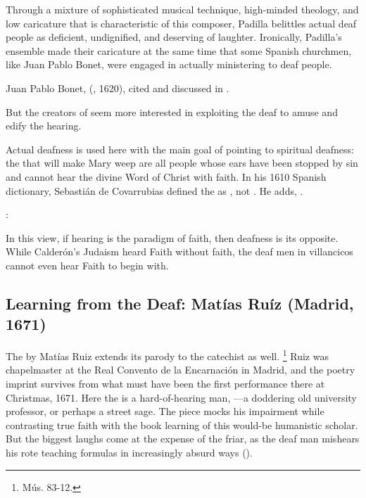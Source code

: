 Through a mixture of sophisticated musical technique, high-minded theology, and low caricature that is characteristic of this composer, Padilla belittles actual deaf people as deficient, undignified, and deserving of laughter.
Ironically, Padilla's ensemble made their caricature at the same time that some Spanish churchmen, like Juan Pablo Bonet, were engaged in actually ministering to deaf people.%
\begin{Footnote}
    Juan Pablo Bonet,  (\XXX, 1620), cited and discussed in \autocite{Plann:DeafEducationSpain}.
\end{Footnote}
But the creators of  seem more interested in exploiting the deaf to amuse and edify the hearing.

Actual deafness is used here with the main goal of pointing to spiritual deafness: the  that will make Mary weep are all people whose ears have been stopped by sin and cannot hear the divine Word of Christ with faith.
In his 1610 Spanish dictionary, Sebastián de Covarrubias defined the  as , not .
He adds, .%
\begin{Footnote}
    \Autocite[]{Covarrubias:Tesoro}:
\end{Footnote}
In this view, if hearing is the paradigm of faith, then deafness is its opposite.
While Calderón's Judaism heard Faith without faith, the deaf men in villancicos cannot even hear Faith to begin with.

\subsection{Learning from the Deaf: Matías Ruíz (Madrid, 1671)}

The  by Matías Ruiz extends its parody to the catechist as well.%
\footnote{\signature{E-E}{Mús. 83-12}.}
Ruiz was chapelmaster at the Real Convento de la Encarnación in Madrid, and the poetry imprint survives from what must have been the first performance there at Christmas, 1671.%
\autocite{1671-Madrid-Enc-Nav}
Here the  is a hard-of-hearing man, ---a doddering old university professor, or perhaps a street sage.
The piece mocks his impairment while contrasting true faith with the book learning of this would-be humanistic scholar.
But the biggest laughs come at the expense of the friar, as the deaf man mishears his rote teaching formulas in increasingly absurd ways ().

